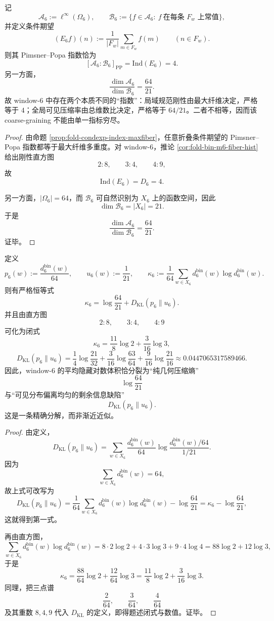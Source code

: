 \begin{theorem}[局域规范指数与全局压缩率的严格分离]\label{thm:conclusion-window6-local-index-global-compression-separation}
记
\[
\mathscr A_6:=\ell^\infty(\Omega_6),
\qquad
\mathscr B_6:=\{f\in \mathscr A_6:\ f\ \text{在每条 }F_w\text{ 上常值}\},
\]
并定义条件期望
\[
(E_6f)(n):=\frac{1}{|F_w|}\sum_{m\in F_w}f(m)
\qquad(n\in F_w).
\]
则其 Pimsner--Popa 指数恰为
\[
[\mathscr A_6:\mathscr B_6]_{\mathrm{PP}}=\mathrm{Ind}(E_6)=4.
\]
另一方面，
\[
\frac{\dim \mathscr A_6}{\dim \mathscr B_6}
=
\frac{64}{21}.
\]
故 window-\(6\) 中存在两个本质不同的“指数”：局域规范刚性由最大纤维决定，严格等于 \(4\)；全局可见压缩率由总维数比决定，严格等于 \(64/21\)。二者不相等，因而该 coarse-graining 不能由单一指标穷尽。
\end{theorem}
\begin{proof}
由命题 \ref{prop:fold-condexp-index-maxfiber}，任意折叠条件期望的 Pimsner--Popa 指数都等于最大纤维多重度。对 window-\(6\)，推论 \ref{cor:fold-bin-m6-fiber-hist} 给出刚性直方图
\[
2:8,\qquad 3:4,\qquad 4:9,
\]
故
\[
\mathrm{Ind}(E_6)=D_6=4.
\]

另一方面，\(|\Omega_6|=64\)，而 \(\mathscr B_6\) 可自然识别为 \(X_6\) 上的函数空间，因此
\[
\dim \mathscr B_6=|X_6|=21.
\]
于是
\[
\frac{\dim \mathscr A_6}{\dim \mathscr B_6}=\frac{64}{21}.
\]
证毕。
\end{proof}

\begin{theorem}\label{thm:conclusion-window6-hidden-logvolume-geometry-information-splitting}
定义
\[
p_6(w):=\frac{d_6^{\mathrm{bin}}(w)}{64},
\qquad
u_6(w):=\frac1{21},
\qquad
\kappa_6:=\frac1{64}\sum_{w\in X_6}d_6^{\mathrm{bin}}(w)\log d_6^{\mathrm{bin}}(w).
\]
则有严格恒等式
\[
\kappa_6=\log\frac{64}{21}+D_{\mathrm{KL}}(p_6\|u_6).
\]
并且由直方图
\[
2:8,\qquad 3:4,\qquad 4:9
\]
可化为闭式
\[
\kappa_6=\frac{11}{8}\log 2+\frac{3}{16}\log 3,
\]
\[
D_{\mathrm{KL}}(p_6\|u_6)
=
\frac14\log\frac{21}{32}
+\frac{3}{16}\log\frac{63}{64}
+\frac{9}{16}\log\frac{21}{16}
\approx 0.0447065317589466.
\]
因此，window-\(6\) 的平均隐藏对数体积恰分裂为“纯几何压缩熵”
\[
\log\frac{64}{21}
\]
与“可见分布偏离均匀的剩余信息缺陷”
\[
D_{\mathrm{KL}}(p_6\|u_6).
\]
这是一条精确分解，而非渐近近似。
\end{theorem}
\begin{proof}
由定义，
\[
D_{\mathrm{KL}}(p_6\|u_6)
=
\sum_{w\in X_6}\frac{d_6^{\mathrm{bin}}(w)}{64}
\log\frac{d_6^{\mathrm{bin}}(w)/64}{1/21}.
\]
因为
\[
\sum_{w\in X_6}d_6^{\mathrm{bin}}(w)=64,
\]
故上式可改写为
\[
D_{\mathrm{KL}}(p_6\|u_6)
=
\frac1{64}\sum_{w\in X_6}d_6^{\mathrm{bin}}(w)\log d_6^{\mathrm{bin}}(w)-\log\frac{64}{21}
=
\kappa_6-\log\frac{64}{21},
\]
这就得到第一式。

再由直方图，
\[
\sum_{w\in X_6}d_6^{\mathrm{bin}}(w)\log d_6^{\mathrm{bin}}(w)
=
8\cdot 2\log 2+4\cdot 3\log 3+9\cdot 4\log 4
=
88\log 2+12\log 3,
\]
于是
\[
\kappa_6
=
\frac{88}{64}\log 2+\frac{12}{64}\log 3
=
\frac{11}{8}\log 2+\frac{3}{16}\log 3.
\]
同理，把三点谱
\[
\frac{2}{64},\qquad \frac{3}{64},\qquad \frac{4}{64}
\]
及其重数 \(8,4,9\) 代入 \(D_{\mathrm{KL}}\) 的定义，即得题述闭式与数值。证毕。
\end{proof}

